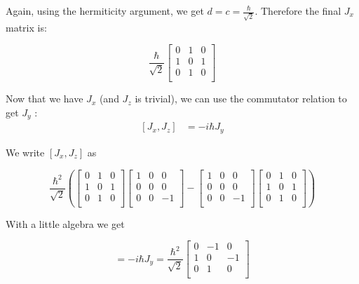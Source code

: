 \begin{alphaparts}
Again, using the hermiticity argument, we get $d = c = \frac{\hbar}{\sqrt{2}}$. Therefore the final $J_x$ matrix is:

\begin{equation}
    \frac{\hbar}{\sqrt{2}}
    \begin{bmatrix}
    0 & 1 & 0 \\
    1 & 0 & 1 \\
    0 & 1 & 0 \\
    \end{bmatrix}
\end{equation}

Now that we have $J_x$ (and $J_z$ is trivial), we can use the commutator relation to get $J_y$ :
\begin{equation}
\begin{split}
    [J_x,J_z] &= -i \hbar J_y  
\end{split}
\end{equation}

We write $[J_x,J_z]$ as

\begin{equation}
    \frac{\hbar^2}{\sqrt{2}}(
    \begin{bmatrix}
    0 & 1 & 0 \\
    1 & 0 & 1 \\
    0 & 1 & 0 \\
    \end{bmatrix}
    \begin{bmatrix}
    1 & 0 & 0 \\
    0 & 0 & 0 \\
    0 & 0 & -1 \\
    \end{bmatrix} 
    -
    \begin{bmatrix}
    1 & 0 & 0 \\
    0 & 0 & 0 \\
    0 & 0 & -1 \\
    \end{bmatrix}
    \begin{bmatrix}
    0 & 1 & 0 \\
    1 & 0 & 1 \\
    0 & 1 & 0 \\
    \end{bmatrix})
\end{equation}

With a little algebra we get 

\begin{equation}
    [J_x,J_z] = -i \hbar J_y  = \frac{\hbar^2}{\sqrt{2}}
        \begin{bmatrix}
    0 & -1 & 0 \\
    1 & 0 & -1 \\
    0 & 1 & 0 \\
    \end{bmatrix}
\end{equation}


\end{alphaparts}

